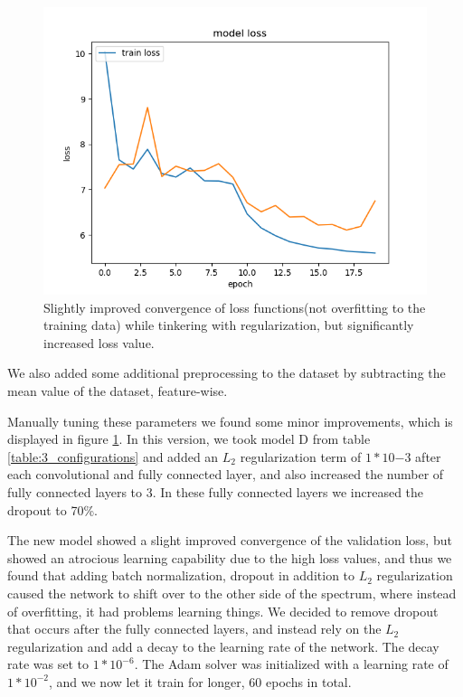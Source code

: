 \documentclass{kthreport}
\begin{document}
\begin{figure}
  \includegraphics[width=\linewidth]{../images/improved_loss_1.png}
  \caption[]
  {\small Slightly improved convergence of loss functions(not overfitting to the training data) while tinkering with regularization, but significantly increased loss value.}
  \label{fig:loss_improved_1}
\end{figure}
\FloatBarrier

We also added some additional preprocessing to the dataset by subtracting the mean value of the dataset, feature-wise.

Manually tuning these parameters we found some minor improvements, which is displayed in figure \ref{fig:loss_improved_1}. In this version, we took model D from table \ref{table:3_configurations} and added an $L_{2}$ regularization term of $1*10{-3}$ after each convolutional and fully connected layer, and also increased the number of fully connected layers to 3. In these fully connected layers we increased the dropout to 70\%.


The new model showed a slight improved convergence of the validation loss, but showed an atrocious learning capability due to the high loss values, and thus we found that adding batch normalization, dropout in addition to $L_{2}$ regularization caused the network to shift over to the other side of the spectrum, where instead of overfitting, it had problems learning things. We decided to remove dropout that occurs after the fully connected layers, and instead rely on the $L_{2}$ regularization and add a decay to the learning rate of the network. The decay rate was set to $1*10^{-6}$. The Adam solver was initialized with a learning rate of $1*10^{-2}$, and we now let it train for longer, 60 epochs in total.
\end{document}
